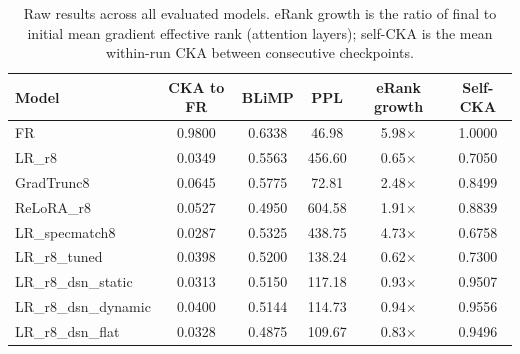 \begin{table}[t]
\centering
\small
\begin{tabular}{lccccc}
\toprule
\textbf{Model} & \textbf{CKA to FR} & \textbf{BLiMP} & \textbf{PPL} & \textbf{eRank growth} & \textbf{Self-CKA} \\
\midrule
FR & 0.9800 & 0.6338 & 46.98 & 5.98$\times$ & 1.0000 \\
LR\_r8 & 0.0349 & 0.5563 & 456.60 & 0.65$\times$ & 0.7050 \\
GradTrunc8 & 0.0645 & 0.5775 & 72.81 & 2.48$\times$ & 0.8499 \\
ReLoRA\_r8 & 0.0527 & 0.4950 & 604.58 & 1.91$\times$ & 0.8839 \\
LR\_specmatch8 & 0.0287 & 0.5325 & 438.75 & 4.73$\times$ & 0.6758 \\
LR\_r8\_tuned & 0.0398 & 0.5200 & 138.24 & 0.62$\times$ & 0.7300 \\
LR\_r8\_dsn\_static & 0.0313 & 0.5150 & 117.18 & 0.93$\times$ & 0.9507 \\
LR\_r8\_dsn\_dynamic & 0.0400 & 0.5144 & 114.73 & 0.94$\times$ & 0.9556 \\
LR\_r8\_dsn\_flat & 0.0328 & 0.4875 & 109.67 & 0.83$\times$ & 0.9496 \\
\bottomrule
\end{tabular}
\caption{Raw results across all evaluated models. eRank growth is the ratio of final to initial mean gradient effective rank (attention layers); self-CKA is the mean within-run CKA between consecutive checkpoints.}
\label{tab:raw_results}
\end{table}
